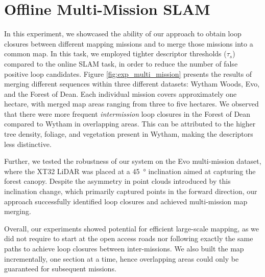 \section{Offline Multi-Mission SLAM} 
\label{sec:offline_multi_mis  sion}
In this experiment, we showcased the ability of our approach to obtain loop closures between different mapping missions and to merge those missions into a common map. In this task, we employed tighter descriptor thresholds ($\tau_{s}$) compared to the online SLAM task, in order to reduce the number of false positive loop candidates.
Figure \ref{fig:exp_multi_mission} presents the results of merging different sequences within three different datasets: Wytham Woods, Evo, and the Forest of Dean. Each individual mission covers approximately one hectare, with merged map areas ranging from three to five hectares.
We observed that there were more frequent \emph{intermission} loop closures in the Forest of Dean compared to Wytham in overlapping areas. This can be attributed to the higher tree density, foliage, and vegetation present in Wytham, making the descriptors less distinctive.     

Further, we tested the robustness of our system on the Evo multi-mission dataset, where the XT32 LiDAR was placed at a \SI{45}{\degree} inclination aimed at capturing the forest canopy. Despite the asymmetry in point clouds introduced by this inclination change, which primarily captured points in the forward direction, our approach successfully identified loop closures and achieved multi-mission map merging.

Overall, our experiments showed potential for efficient large-scale mapping, as we did not require to start at the open access roads nor following exactly the same paths to achieve loop closures between inter-missions. We also built the map incrementally, one section at a time, hence overlapping areas could only be guaranteed for subsequent missions.



